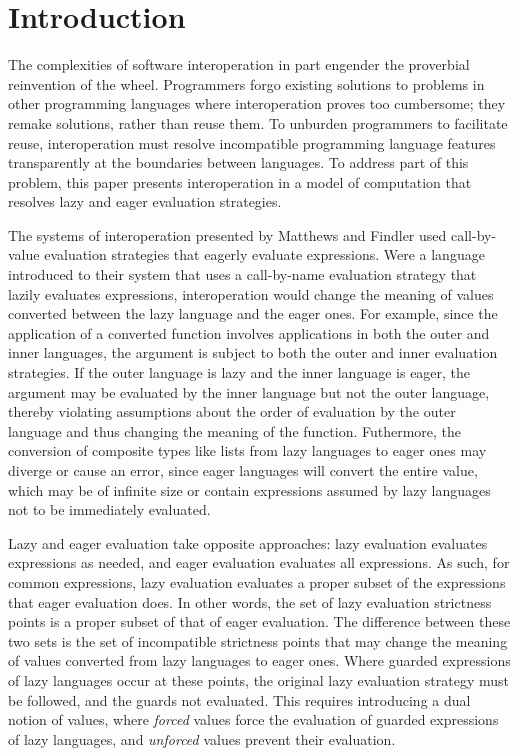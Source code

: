 \section{Introduction}

The complexities of software interoperation in part engender the proverbial reinvention of the wheel. Programmers forgo existing solutions to problems in other programming languages where interoperation proves too cumbersome; they remake solutions, rather than reuse them. To unburden programmers to facilitate reuse, interoperation must resolve incompatible programming language features transparently at the boundaries between languages. To address part of this problem, this paper presents interoperation in a model of computation that resolves lazy and eager evaluation strategies.

The systems of interoperation presented by Matthews and Findler \cite{matthews07} used call-by-value evaluation strategies that eagerly evaluate expressions. Were a language introduced to their system that uses a call-by-name evaluation strategy that lazily evaluates expressions, interoperation would change the meaning of values converted between the lazy language and the eager ones. For example, since the application of a converted function involves applications in both the outer and inner languages, the argument is subject to both the outer and inner evaluation strategies. If the outer language is lazy and the inner language is eager, the argument may be evaluated by the inner language but not the outer language, thereby violating assumptions about the order of evaluation by the outer language and thus changing the meaning of the function. Futhermore, the conversion of composite types like lists from lazy languages to eager ones may diverge or cause an error, since eager languages will convert the entire value, which may be of infinite size or contain expressions assumed by lazy languages not to be immediately evaluated.

Lazy and eager evaluation take opposite approaches: lazy evaluation evaluates expressions as needed, and eager evaluation evaluates all expressions. As such, for common expressions, lazy evaluation evaluates a proper subset of the expressions that eager evaluation does. In other words, the set of lazy evaluation strictness points is a proper subset of that of eager evaluation. The difference between these two sets is the set of incompatible strictness points that may change the meaning of values converted from lazy languages to eager ones. Where guarded expressions of lazy languages occur at these points, the original lazy evaluation strategy must be followed, and the guards not evaluated. This requires introducing a dual notion of values, where \emph{forced} values force the evaluation of guarded expressions of lazy languages, and \emph{unforced} values prevent their evaluation.